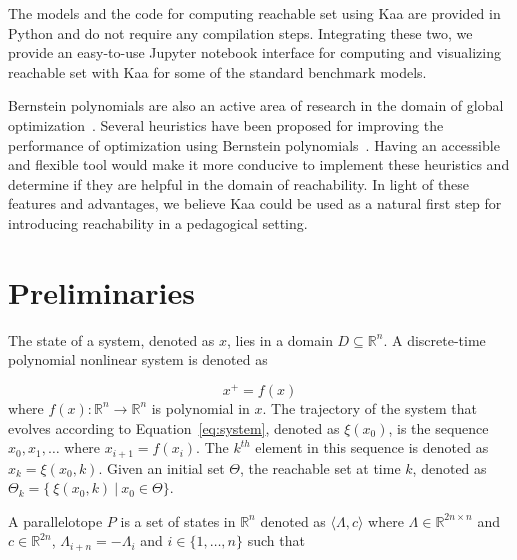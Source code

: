 \documentclass[EPiC]{easychair}
\begin{document}
%
The models and the code for computing reachable set using Kaa are provided in Python and do not require any compilation steps.
%
Integrating these two, we provide an easy-to-use Jupyter notebook interface for computing and visualizing reachable set with Kaa for some of the standard benchmark models.
%
%
%

Bernstein polynomials are also an active area of research in the domain of global optimization~\cite{nataray2002algorithm,garloff2003bernstein,nataraj2007new}.
%
Several heuristics have been proposed for improving the performance of optimization using Bernstein polynomials~\cite{kodiak,smith2009fast,munoz2013formalization}. 
%
%
Having an accessible and flexible tool would make it more conducive to implement these heuristics and determine if they are helpful in the domain of reachability.
%
In light of these features and advantages, we believe Kaa could be used as a natural first step for introducing reachability in a pedagogical setting.

\section{Preliminaries}

The state of a system, denoted as $x$, lies in a domain $D \subseteq \mathbb{R}^n$. A discrete-time polynomial nonlinear system is denoted as

\begin{equation}
    x^{+} = f(x)
\label{eq:system}
\end{equation}
where $f(x) : \mathbb{R}^n \rightarrow \mathbb{R}^n$ is polynomial in $x$. 
%
The trajectory of the system that evolves according to Equation~\eqref{eq:system}, denoted as $\xi(x_0)$, is the sequence $x_0, x_1, \ldots$ where $x_{i+1} = f(x_i)$. 
%
The $k^{th}$ element in this sequence is denoted as $x_k = \xi(x_0,k)$.
%
Given an initial set $\Theta$, the reachable set at time $k$, denoted as $\Theta_{k} = \{~ \xi(x_0,k)~|~ x_0 \in \Theta\}$.

A parallelotope $P$ is a set of states in $\mathbb{R}^{n}$ denoted as $\langle \Lambda, c\rangle$ where $\Lambda \in \mathbb{R}^{2n \times n}$ and $c \in \mathbb{R}^{2n}$, $\Lambda_{i+n} = -\Lambda_{i}$ and $i \in \{1, \ldots, n\}$ such that
\end{document}
